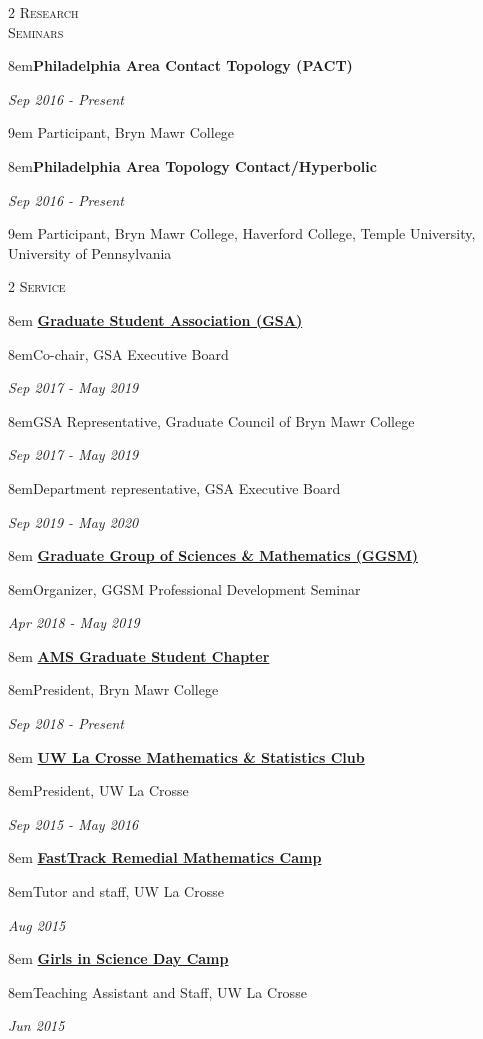 \documentclass[11pt]{article}
\newcommand{\itemreg}[1]{\begin{addmargin}[0em]{8em} #1 \end{addmargin}}
\newcommand{\itemregind}[1]{\begin{addmargin}[1.75em]{9em} #1 \end{addmargin}}
\newcommand{\itemregdate}[2]{\begin{addmargin}[0em]{8em}#1\end{addmargin}\vspace{-1.5em}\hfill\textit{#2}\\ \vspace{.25em}}
\newcommand{\iteminddate}[2]{\begin{addmargin}[1.75em]{8em}#1\end{addmargin}\vspace{-1.15em}\hfill\textit{#2}\\}
\begin{document}
\begin{multicols}{2}
	\textsc{Research \\ Seminars}
	
	\columnbreak
	
	\itemregdate{\textbf{Philadelphia Area Contact Topology (PACT)}}{Sep 2016 - Present}
		\itemregind{Participant, Bryn Mawr College}
	\vspace{.35em}
	\itemregdate{\textbf{Philadelphia Area Topology Contact/Hyperbolic}}{Sep 2016 - Present}
		\itemregind{Participant, Bryn Mawr College, Haverford College, Temple University, University of Pennsylvania}
	
\end{multicols}
\vspace{-.5em}



\begin{multicols}{2}
	\textsc{Service}
	
	\columnbreak
	
	\itemreg{\textbf{\href{https://www.brynmawr.edu/gsas/}{Graduate Student Association (GSA)}}}
		\iteminddate{Co-chair, GSA Executive Board}{Sep 2017 - May 2019}
		\iteminddate{GSA Representative, Graduate Council of Bryn Mawr College}{Sep 2017 - May 2019}
		\iteminddate{Department representative, GSA Executive Board}{Sep 2019 - May 2020}
		\vspace{.35em}
		
	\itemreg{\textbf{\href{https://www.brynmawr.edu/ggsm}{Graduate Group of Sciences \& Mathematics (GGSM)}}}
		\iteminddate{Organizer, GGSM Professional Development Seminar}{Apr 2018 - May 2019}
		\vspace{.35em}
		
	\itemreg{\textbf{\href{http://www.ams.org/programs/studentchapters}{AMS Graduate Student Chapter}}}
		\iteminddate{President, Bryn Mawr College}{Sep 2018 - Present}
		\vspace{.35em}
		
	\itemreg{\textbf{\href{https://www.uwlax.edu/mathematics/activities/mathematics-and-stats-club/}{UW La Crosse Mathematics \& Statistics Club}}}
		\iteminddate{President, UW La Crosse}{Sep 2015 - May 2016}
		\vspace{.35em}
	
	\itemreg{\textbf{\href{https://www.uwlax.edu/mathematics/fasttrack/}{FastTrack Remedial Mathematics Camp}}}
		\iteminddate{Tutor and staff, UW La Crosse}{Aug 2015}
		\vspace{.35em}
	
	\itemreg{\textbf{\href{https://www.uwlax.edu/conted/youth-programs/girls-in-science/welcome/}{Girls in Science Day Camp}}}
		\iteminddate{Teaching Assistant and Staff, UW La Crosse}{Jun 2015}
\end{multicols}
\end{document}
